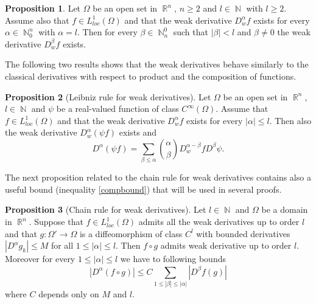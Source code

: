 \documentclass[12pt]{article}
\theoremstyle{definition}
\newtheorem{prop}{Proposition}
\DeclareMathOperator\rr{\mathbb{R}}
\DeclareMathOperator\nn{\mathbb{N}}
\begin{document}
\begin{prop}
	Let $\Omega$ be an open set in $\rr^n$, $n \ge2$ and $l \in \nn$ with $l\ge2$. Assume also that $f \in L^1_{loc}(\Omega)$ and that the weak derivative $D^\alpha_wf $ exists for every $\alpha\in \nn^n_0$ with $\alpha=l$. Then for every $\beta \in \nn^0_n$ such that $|\beta|<l$ and $\beta \neq 0$ the weak derivative $D^\beta_w f$ exists.
\end{prop}
The following two results shows that the weak derivatives behave similarly to the classical derivatives with respect to product and the composition of functions. 
\begin{prop}[Leibniz rule for weak derivatives]
	Let $\Omega$ be an open set in $\rr^n$, $l\in \nn$ and $\psi$ be a real-valued function of class $C^\infty(\Omega)$.  Assume that $f \in L^1_{loc}(\Omega)$ and that the weak derivative $D^\alpha_wf$ exists for every $|\alpha|\le l.$ Then also the weak derivative $D^\alpha_w(\psi f)$ exists and  
	\[ D^\alpha(\psi f)=\sum_{\beta \le \alpha} {\alpha \choose \beta} D^{\alpha-\beta}_wfD^\beta \psi.\]
\end{prop}
The next proposition related to the chain rule for weak derivatives contains also a useful bound (inequality \eqref{compbound}) that will be used in several proofs.
\begin{prop}[Chain rule for weak derivatives]\label{composition}
Let $l \in \nn$ and $\Omega$ be a domain in $\rr^n$. Suppose that $f \in L^1_{loc}(\Omega)$ admits all the weak derivatives up to order $l$ and that $g:\Omega'\rightarrow \Omega$ is a diffeomorphism of class $C^l$ with bounded derivatives $|D^\alpha g_k|\le M$ for all $1 \le |\alpha| \le l$. Then $f\circ g$ admits weak derivative up to order $l$. Moreover for every $1\le |\alpha|\le l$ we have to following bounds
\begin{equation} |D^\alpha (f\circ g)|\le C \sum_{1\le|\beta|\le |\alpha|} |D^\beta f(g)| \label{compbound}
\end{equation}
where $C$ depends only on $M$ and $l$.
\end{prop}
\end{document}
